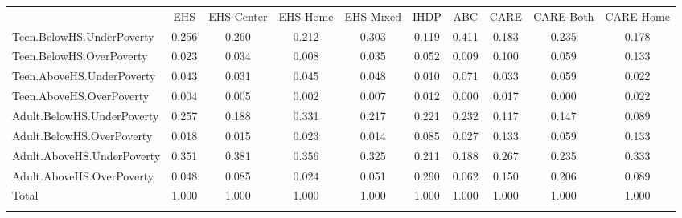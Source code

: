 \begin{tabular}{lccccccccc}
\hline \noalign{\smallskip} & EHS & EHS-Center & EHS-Home & EHS-Mixed & IHDP & ABC & CARE & CARE-Both & CARE-Home\\
\noalign{\smallskip}\hline \noalign{\smallskip}Teen.BelowHS.UnderPoverty & 0.256 & 0.260 & 0.212 & 0.303 & 0.119 & 0.411 & 0.183 & 0.235 & 0.178\\
Teen.BelowHS.OverPoverty & 0.023 & 0.034 & 0.008 & 0.035 & 0.052 & 0.009 & 0.100 & 0.059 & 0.133\\
Teen.AboveHS.UnderPoverty & 0.043 & 0.031 & 0.045 & 0.048 & 0.010 & 0.071 & 0.033 & 0.059 & 0.022\\
Teen.AboveHS.OverPoverty & 0.004 & 0.005 & 0.002 & 0.007 & 0.012 & 0.000 & 0.017 & 0.000 & 0.022\\
Adult.BelowHS.UnderPoverty & 0.257 & 0.188 & 0.331 & 0.217 & 0.221 & 0.232 & 0.117 & 0.147 & 0.089\\
Adult.BelowHS.OverPoverty & 0.018 & 0.015 & 0.023 & 0.014 & 0.085 & 0.027 & 0.133 & 0.059 & 0.133\\
Adult.AboveHS.UnderPoverty & 0.351 & 0.381 & 0.356 & 0.325 & 0.211 & 0.188 & 0.267 & 0.235 & 0.333\\
Adult.AboveHS.OverPoverty & 0.048 & 0.085 & 0.024 & 0.051 & 0.290 & 0.062 & 0.150 & 0.206 & 0.089\\
Total & 1.000 & 1.000 & 1.000 & 1.000 & 1.000 & 1.000 & 1.000 & 1.000 & 1.000\\
\noalign{\smallskip}\hline\end{tabular}\\
